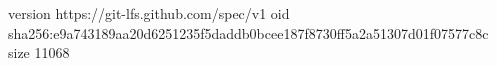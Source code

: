 version https://git-lfs.github.com/spec/v1
oid sha256:e9a743189aa20d6251235f5daddb0bcee187f8730ff5a2a51307d01f07577c8c
size 11068
